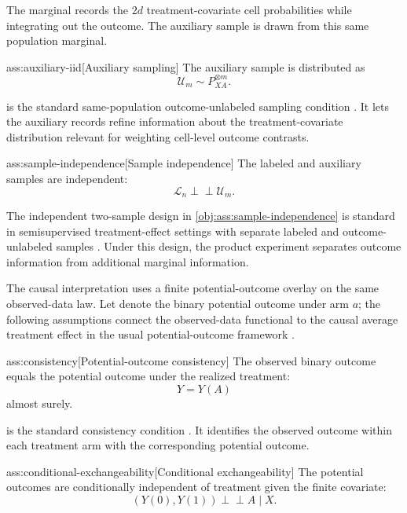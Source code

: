 \documentclass[11pt]{article}
\begin{document}
The marginal  records the \(2d\) treatment-covariate cell probabilities while integrating out the outcome. The auxiliary sample  is drawn from this same population marginal.

\begin{assumptionv}{ass:auxiliary-iid}[Auxiliary sampling]
The auxiliary sample is distributed as
\[
\mathcal U_m \sim P_{XA}^{\otimes m}.
\]
\end{assumptionv}

 is the standard same-population outcome-unlabeled sampling condition \citep{ChakraborttyDai2024}. It lets the auxiliary records refine information about the treatment-covariate distribution relevant for weighting cell-level outcome contrasts.

\begin{assumptionv}{ass:sample-independence}[Sample independence]
The labeled and auxiliary samples are independent:
\[
\mathcal L_n \perp\!\!\!\perp \mathcal U_m .
\]
\end{assumptionv}

The independent two-sample design in \cref{obj:ass:sample-independence} is standard in semisupervised treatment-effect settings with separate labeled and outcome-unlabeled samples \citep{ChakraborttyDai2024}. Under this design, the product experiment separates outcome information from additional marginal information.

The causal interpretation uses a finite potential-outcome overlay on the same observed-data law. Let  denote the binary potential outcome under arm \(a\); the following assumptions connect the observed-data functional to the causal average treatment effect in the usual potential-outcome framework \citep{Rubin1974,ImbensRubin2015}.

\begin{assumptionv}{ass:consistency}[Potential-outcome consistency]
The observed binary outcome equals the potential outcome under the realized treatment:
\[
Y = Y(A)
\]
almost surely.
\end{assumptionv}

 is the standard consistency condition \citep{ZengBalakrishnanHanKennedy2024}. It identifies the observed outcome within each treatment arm with the corresponding potential outcome.

\begin{assumptionv}{ass:conditional-exchangeability}[Conditional exchangeability]
The potential outcomes are conditionally independent of treatment given the finite covariate:
\[
(Y(0),Y(1)) \perp\!\!\!\perp A \mid X .
\]
\end{assumptionv}
\end{document}
